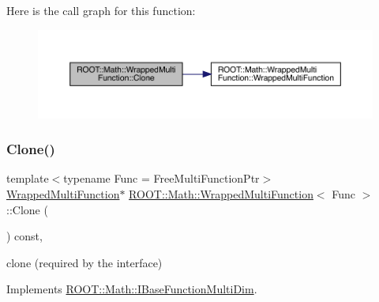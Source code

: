 Here is the call graph for this function\+:
\nopagebreak
\begin{figure}[H]
\begin{center}
\leavevmode
\includegraphics[width=350pt]{de/da4/classROOT_1_1Math_1_1WrappedMultiFunction_aafa24e359a607b4278f1bf238bdbc336_cgraph}
\end{center}
\end{figure}
\mbox{\label{classROOT_1_1Math_1_1WrappedMultiFunction_aafa24e359a607b4278f1bf238bdbc336}} 
\subsubsection{\texorpdfstring{Clone()}{Clone()}\hspace{0.1cm}{\footnotesize\ttfamily [3/3]}}
{\footnotesize\ttfamily template$<$typename Func  = Free\+Multi\+Function\+Ptr$>$ \\
\mbox{\hyperlink{classROOT_1_1Math_1_1WrappedMultiFunction}{Wrapped\+Multi\+Function}}$\ast$ \mbox{\hyperlink{classROOT_1_1Math_1_1WrappedMultiFunction}{R\+O\+O\+T\+::\+Math\+::\+Wrapped\+Multi\+Function}}$<$ Func $>$\+::Clone (\begin{DoxyParamCaption}{ }\end{DoxyParamCaption}) const\hspace{0.3cm}{\ttfamily [inline]}, {\ttfamily [virtual]}}



clone (required by the interface) 



Implements \mbox{\hyperlink{classROOT_1_1Math_1_1IBaseFunctionMultiDim_a57939204b1f525b43835b42e0635dd3b}{R\+O\+O\+T\+::\+Math\+::\+I\+Base\+Function\+Multi\+Dim}}.

